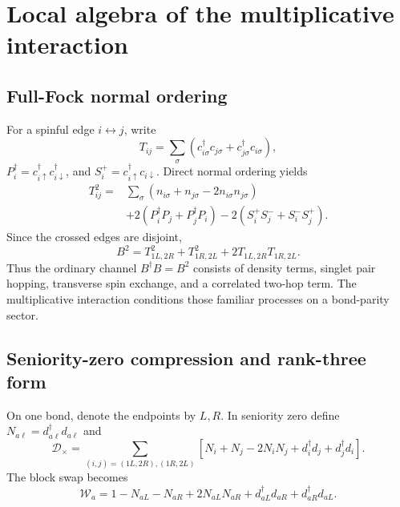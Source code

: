 \documentclass[11pt]{article}
\theoremstyle{definition}
\theoremstyle{remark}
\begin{document}
\section{Local algebra of the multiplicative interaction}
\label{sec:local-algebra}

\subsection{Full-Fock normal ordering}

For a spinful edge $i\leftrightarrow j$, write
\begin{equation}
 T_{ij}=\sum_\sigma(c_{i\sigma}^\dagger c_{j\sigma}+c_{j\sigma}^\dagger c_{i\sigma}),
\end{equation}
$P_i^\dagger=c_{i\uparrow}^\dagger c_{i\downarrow}^\dagger$, and $S_i^+=c_{i\uparrow}^\dagger c_{i\downarrow}$.  Direct normal ordering yields
\begin{equation}
\boxed{
\begin{aligned}
 T_{ij}^2={}&\sum_\sigma
 (n_{i\sigma}+n_{j\sigma}-2n_{i\sigma}n_{j\sigma})\\
 &+2(P_i^\dagger P_j+P_j^\dagger P_i)
 -2(S_i^+S_j^-+S_i^-S_j^+).
\end{aligned}}
\label{eq:T-square}
\end{equation}
Since the crossed edges are disjoint,
\begin{equation}
 B^2=T_{1L,2R}^2+T_{1R,2L}^2+2T_{1L,2R}T_{1R,2L}.
 \label{eq:B-square-full}
\end{equation}
Thus the ordinary channel $B^\dagger B=B^2$ consists of density terms, singlet pair hopping, transverse spin exchange, and a correlated two-hop term.  The multiplicative interaction conditions those familiar processes on a bond-parity sector.

\subsection{Seniority-zero compression and rank-three form}

On one bond, denote the endpoints by $L,R$.  In seniority zero define $N_{a\ell}=d_{a\ell}^\dagger d_{a\ell}$ and
\begin{equation}
 \mathcal D_\times=\sum_{(i,j)=(1L,2R),(1R,2L)}
 [N_i+N_j-2N_iN_j+d_i^\dagger d_j+d_j^\dagger d_i].
\end{equation}
The block swap becomes
\begin{equation}
 \mathcal W_a=1-N_{aL}-N_{aR}+2N_{aL}N_{aR}
 +d_{aL}^\dagger d_{aR}+d_{aR}^\dagger d_{aL}.
\end{equation}
\end{document}
